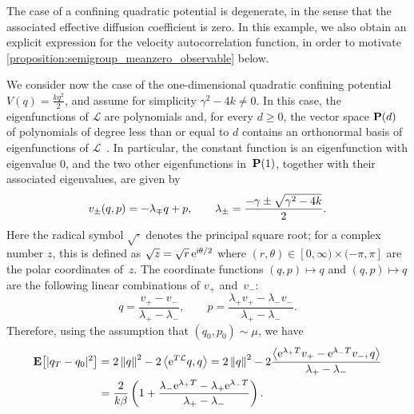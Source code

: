 \documentclass[11pt,a4paper]{article}
\begin{document}
The case of a confining quadratic potential is degenerate,
in the sense that the associated effective diffusion coefficient is zero.
In this example,
we also obtain an explicit expression for the velocity autocorrelation function,
in order to motivate \cref{proposition:semigroup_meanzero_observable} below.
\begin{example}
    \label{example:quadratic}
    We consider now the case of the one-dimensional quadratic confining potential $V(q) = \frac{k q^2}{2}$,
    and assume for simplicity $\gamma^2 - 4 k \neq 0$.
    In this case, the eigenfunctions of $\mathcal L$ are polynomials
    and, for every $d \geq 0$, the vector space $\mathbf P(d)$ of polynomials of degree less than or equal to $d$
    contains an orthonormal basis of eigenfunctions of $\mathcal L$~\cite[Section~6.3]{pavliotis2011applied}.
    In particular, the constant function is an eigenfunction with eigenvalue 0,
    and the two other eigenfunctions in~$\mathbf P(1)$, together with their associated eigenvalues,
    are given by
    \begin{equation*}
        v_{\pm}(q, p) =
        - \lambda_{\mp} q + p, \\
        \qquad
        \lambda_{\pm} = \frac{- \gamma \pm \sqrt{\gamma^2 - 4k}}{2}.
    \end{equation*}
    Here the radical symbol $\sqrt{\cdot}$ denotes the principal square root;
    for a complex number $z$, this is defined as $\sqrt{z} = \sqrt{r} \, \mathrm{e}^{\mathrm{i} \theta/2}$ where $(r, \theta) \in [0, \infty) \times (-\pi, \pi]$ are the polar coordinates of~$z$.
    The coordinate functions $(q, p) \mapsto q$ and $(q, p) \mapsto q$ are the following linear combinations of $v_+$ and~$v_-$:
    \[
        q = \frac{v_+ - v_-}{\lambda_+ - \lambda_-},
        \qquad
        p = \frac{\lambda_+ v_+ - \lambda_- v_-}{\lambda_+ - \lambda_-}.
    \]
    Therefore,
    using the assumption that $(q_0, p_0) \sim \mu$,
    we have
    \begin{align*}
        \expect \bigl[ \lvert q_T - q_0 \rvert^2 \bigr]
        &= 2 \norm{q}^2 - 2 \ip{\e^{T \mathcal L}q}{q}
        = 2 \norm{q}^2 - 2 \frac{\ip{\e^{\lambda_+ T} v_+ - \e^{\lambda_- T} v_-}{q}}{\lambda_+ - \lambda_-} \\
        &= \frac{2}{k \beta} \left( 1 +  \frac{\lambda_- \e^{\lambda_+ T} - \lambda_+ \e^{\lambda_- T}}{\lambda_+ - \lambda_-} \right).

\end{align*}
\end{example}
\end{document}
